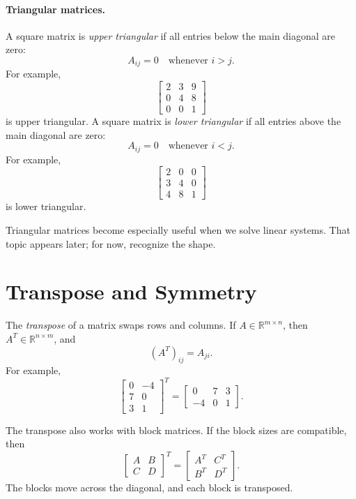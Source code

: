 \paragraph{Triangular matrices.}
\label{mf:triangular-matrices}
A square matrix is \emph{upper triangular} if all entries below the main diagonal are zero:
\[
    A_{ij}=0 \quad \text{whenever } i>j.
\]
For example,
\[
    \begin{bmatrix}
        2 & 3 & 9\\
        0 & 4 & 8\\
        0 & 0 & 1
    \end{bmatrix}
\]
is upper triangular. A square matrix is \emph{lower triangular} if all entries above the main diagonal are zero:
\[
    A_{ij}=0 \quad \text{whenever } i<j.
\]
For example,
\[
    \begin{bmatrix}
        2 & 0 & 0\\
        3 & 4 & 0\\
        4 & 8 & 1
    \end{bmatrix}
\]
is lower triangular.

Triangular matrices become especially useful when we solve linear systems. That topic appears later; for now, recognize the shape.

\section{Transpose and Symmetry}
\label{mf:transpose}
\label{mf:symmetric-matrix}

The \emph{transpose} of a matrix swaps rows and columns. If \(A\in\mathbb{R}^{m\times n}\), then \(A^T\in\mathbb{R}^{n\times m}\), and
\[
    (A^T)_{ij}=A_{ji}.
\]
For example,
\[
    \begin{bmatrix}
        0 & -4\\
        7 & 0\\
        3 & 1
    \end{bmatrix}^T
    =
    \begin{bmatrix}
        0 & 7 & 3\\
        -4 & 0 & 1
    \end{bmatrix}.
\]

The transpose also works with block matrices. If the block sizes are compatible, then
\[
    \begin{bmatrix}
        A & B\\
        C & D
    \end{bmatrix}^T
    =
    \begin{bmatrix}
        A^T & C^T\\
        B^T & D^T
    \end{bmatrix}.
\]
The blocks move across the diagonal, and each block is transposed.

